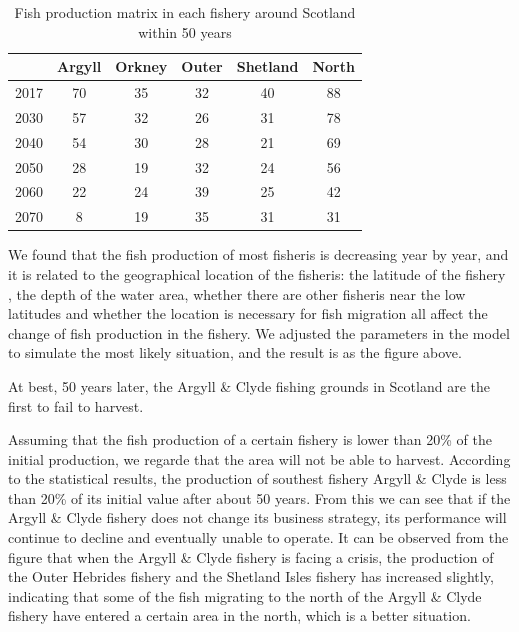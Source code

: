 \documentclass{mcmthesis}
\numberwithin{figure}{section}
\numberwithin{table}{section}
\begin{document}
\begin{table}[!htbp]
  \centering
  \begin{tabular}{|r|c|c|c|c|c|}%
  \hline  %
   & \textbf{Argyll} & \textbf{Orkney} & \textbf{Outer} & \textbf{Shetland} &\textbf{North}\\
  \hline %
  2017 & 70 &35 &32&40&88\\
  \hline %
  2030 & 57&32&26&31&78\\
  \hline %
  2040  & 54&30&28&21&69\\
  \hline %
  2050 &28&19&32&24&56\\
  \hline %
  2060 &22&24&39&25&42\\
  \hline %
  2070 &8&19&35&31&31\\
  \hline %
  \end{tabular}
  \caption{Fish production matrix in each fishery around Scotland within 50 years}
  \label{FisheryTable}
  \end{table}

We found that the fish production of most fisheris is decreasing year by year, and it is related to the geographical location of the fisheris: the latitude of the fishery , the depth of the water area, whether there are other fisheris near the low latitudes and  whether the location is necessary for fish migration all affect the change of fish production in the fishery. We adjusted the parameters in the model to simulate the most likely situation, and the result is as the figure above.

At best, 50 years later, the Argyll \& Clyde fishing grounds in Scotland are the first to fail to harvest.

Assuming that the fish production of a certain fishery is lower than 20\% of the initial production, we regarde that the area will not be able to harvest. According to the statistical results, the production of southest fishery Argyll \& Clyde is less than 20\% of its initial value after about 50 years. From this we can see that if the Argyll \& Clyde fishery does not change its business strategy, its performance will continue to decline and eventually unable to operate. It can be observed from the figure that when the Argyll \& Clyde fishery is facing a crisis, the production of the Outer Hebrides fishery and the Shetland Isles fishery has increased slightly, indicating that some of the fish migrating to the north of the Argyll \& Clyde fishery have entered a certain area in the north, which is a better situation.
\end{document}
